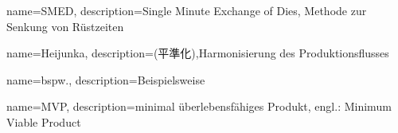 %
{
  name=SMED, 
  description={Single Minute Exchange of Dies, Methode zur Senkung von Rüstzeiten}
}

{
  name=Heijunka, 
  description={(平準化),Harmonisierung des Produktionsflusses}
}

{
  name=bspw.,
  description={Beispielsweise}
}

%
{  
  name=MVP,
  description={minimal überlebensfähiges Produkt, engl.: Minimum Viable
Product}
}
